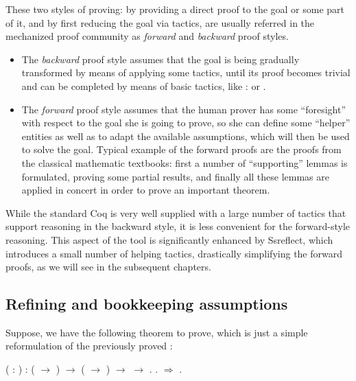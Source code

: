 These two styles of proving: by providing a direct proof to the goal
or some part of it, and by first reducing the goal via tactics, are
usually referred in the mechanized proof community as \textit{forward} and
\textit{backward} proof styles.



\begin{itemize}
\item  The \textit{backward} proof style assumes that the goal is being gradually
  transformed by means of applying some tactics, until its proof
  becomes trivial and can be completed by means of basic tactics,
  like : or .



\item  The \textit{forward} proof style assumes that the human prover has some
  ``foresight'' with respect to the goal she is going to prove, so she
  can define some ``helper'' entities as well as to adapt the available
  assumptions, which will then be used to solve the goal. Typical
  example of the forward proofs are the proofs from the classical
  mathematic textbooks: first a number of ``supporting'' lemmas is
  formulated, proving some partial results, and finally all these
  lemmas are applied in concert in order to prove an important
  theorem.

\end{itemize}


While the standard Coq is very well supplied with a large number of
tactics that support reasoning in the backward style, it is less
convenient for the forward-style reasoning. This aspect of the tool is
significantly enhanced by Ssreflect, which introduces a small number
of helping tactics, drastically simplifying the forward proofs, as we
will see in the subsequent chapters.


\subsection{Refining and bookkeeping assumptions}




Suppose, we have the following theorem to prove, which is just a
simple reformulation of the previously proved :
\begin{coqdoccode}
\coqdocemptyline
\coqdocnoindent
{}  (  : ) : ( \ensuremath{\rightarrow} ) \ensuremath{\rightarrow} ( \ensuremath{\rightarrow} ) \ensuremath{\rightarrow}  \ensuremath{\rightarrow} .\coqdoceol
\coqdocnoindent
{}.\coqdoceol
\coqdocnoindent
{}\ensuremath{\Rightarrow}  .\coqdoceol
\coqdocemptyline
\end{coqdoccode}


